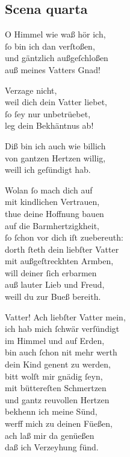 \documentclass{ees}
\newenvironment{lyrics}[1]{%
  \subsection{#1}\nopagebreak%
  \begin{lyricslist}%
  \let\voice\item%
}{%
  \end{lyricslist}%
}
\newcommand\voiceSohn{\voice[Sohn]}
\newcommand\voiceBarmherzigkeit{\voice[Barmh.]}
\begin{document}
\begin{lyrics}{Scena quarta}
  \voiceSohn
  O Himmel wie waß hör ich,\\
  ſo bin ich dan verſtoßen,\\
  und gäntzlich außgeſchloßen\\
  auß meines Vatters Gnad!

  \voiceBarmherzigkeit
  Verzage nicht,\\
  weil dich dein Vatter liebet,\\
  ſo ſey nur unbetrüebet,\\
  leg dein Bekhäntnus ab!

  \voiceSohn
  Diß bin ich auch wie billich\\
  von gantzen Hertzen willig,\\
  weill ich geſündigt hab.

  \voiceBarmherzigkeit
  Wolan ſo mach dich auf\\
  mit kindlichen Vertrauen,\\
  thue deine Hoffnung bauen\\
  auf die Barmhertzigkheit,\\
  ſo ſchon vor dich iſt zuebereuth:\\
  dorth ſteth dein liebſter Vatter\\
  mit außgeſtreckhten Armben,\\
  will deiner ſich erbarmen\\
  auß lauter Lieb und Freud,\\
  weill du zur Bueß bereith.

  \voiceSohn
  Vatter! Ach liebſter Vatter mein,\\
  ich hab mich ſchwär verſündigt\\
  im Himmel und auf Erden,\\
  bin auch ſchon nit mehr werth\\
  dein Kind genent zu werden,\\
  bitt wolſt mir gnädig ſeyn,\\
  mit büttereſten Schmertzen\\
  und gantz reuvollen Hertzen\\
  bekhenn ich meine Sünd,\\
  werff mich zu deinen Füeßen,\\
  ach laß mir da genüeßen\\
  daß ich Verzeyhung fünd.
\end{lyrics}
\end{document}
